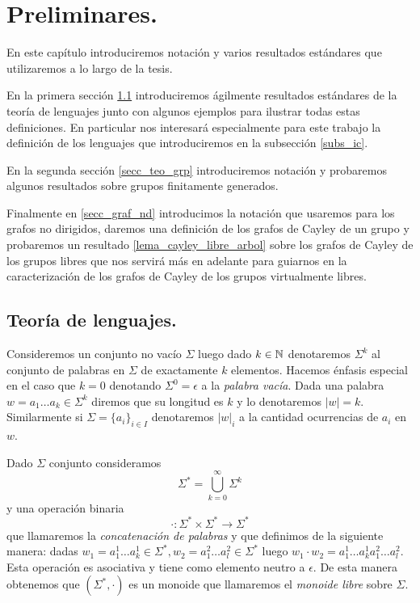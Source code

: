 \documentclass[tesis.tex]{subfiles}
\begin{document}
\chapter{Preliminares.}


En este capítulo introduciremos notación y varios resultados estándares que utilizaremos a lo largo de la tesis.

En la primera sección \ref{secc_tlen} introduciremos ágilmente resultados estándares de la teoría de lenguajes junto con algunos ejemplos para ilustrar todas estas definiciones.
En particular nos interesará especialmente para este trabajo la definición de los lenguajes \ic que introduciremos en la subsección \ref{subs_ic}. 


En la segunda sección \ref{secc_teo_grp} introduciremos notación y probaremos algunos resultados  sobre grupos finitamente generados. 


Finalmente en \ref{secc_graf_nd} introducimos la notación que usaremos para los grafos no dirigidos, daremos una definición de los grafos de Cayley de un grupo y probaremos un resultado \ref{lema_cayley_libre_arbol} sobre los grafos de Cayley de los grupos libres que nos servirá más en adelante para guiarnos en la caracterización de los grafos de Cayley de los grupos virtualmente libres.


\section{Teoría de lenguajes.}\label{secc_tlen}	


Consideremos un conjunto no vacío $\Sigma$ luego dado $k \in \mathbb{N}$ denotaremos $\Sigma^k$ al conjunto de palabras en $\Sigma$ de exactamente $k$ elementos.
Hacemos énfasis especial en el caso que $k=0$ denotando $\Sigma^0 = \epsilon$ a la \emph{palabra vacía}.
Dada una palabra $w= a_1 \dots a_k \in \Sigma^k$ diremos que su longitud es $k$ y lo denotaremos $|w| = k$. 
Similarmente si $ \Sigma = \{ a_{i} \}_{i \in I} $ denotaremos $|w|_{i}$ a la cantidad ocurrencias de $a_{i}$ en $w$.



\begin{deff}
	Dado $\Sigma$ conjunto consideramos
	\begin{equation*}
		\Sigma^{*} = \bigcup_{k=0}^{\infty} \Sigma^k
	\end{equation*}
	y una operación binaria
	\[
		\cdot: \Sigma^{*} \times \Sigma^{*} \to \Sigma^{*}
	\]
	que llamaremos la \emph{concatenación de palabras} y que definimos de la siguiente manera: 
	dadas $w_1=a_{1}^1 \dots a_{k}^1 \in \Sigma^{*}, w_2 = a_{1}^{2} \dots a_{l}^{2} \in \Sigma^{*}$ luego $w_1 \cdot w_2 = a_{1}^1 \dots a_{k}^1 a_{1}^{2} \dots a_{l}^{2} $.
	Esta operación es asociativa y tiene como elemento neutro a $\epsilon$.
	De esta manera obtenemos que $(\Sigma^{*}, \cdot)$ es un monoide que llamaremos el \emph{monoide libre} sobre $\Sigma$.
\end{deff}
\end{document}
